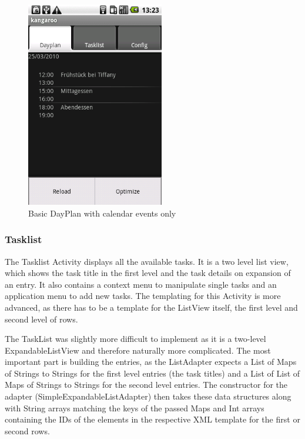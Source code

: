 \begin{figure}[h!]
    \centering
    \includegraphics[width=6cm]{pics/gui/main.png}
    \caption{Basic DayPlan with calendar events only}
    \label{img:dayplan}
\end{figure}


\subsubsection{Tasklist} %
\label{ssub:Tasklist}
The Tasklist Activity displays all the available tasks. It is a two level
list view, which shows the task title in the first level and the task details
on expansion of an entry. It also contains a context menu to manipulate single
tasks and an application menu to add new tasks. The templating for this
Activity is more advanced, as there has to be a template for the ListView
itself, the first level and second level of rows.

The TaskList was slightly more difficult to implement as it is a two-level
ExpandableListView and therefore naturally more complicated. The most important
part is building the entries, as the ListAdapter expects a List of Maps of
Strings to Strings for the first level entries (the task titles) and a List
of List of Maps of Strings to Strings for the second level entries. The
constructor for the adapter (SimpleExpandableListAdapter) then takes these
data structures along with String arrays matching the keys of the passed Maps
and Int arrays containing the IDs of the elements in the respective XML
template for the first or second rows.

